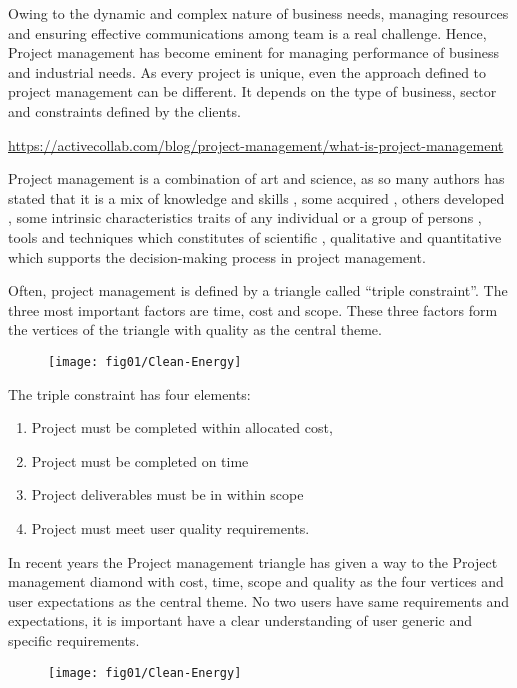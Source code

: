 Owing to the dynamic and complex nature of business needs, managing resources and ensuring effective communications among team is a real challenge. Hence, Project management has become eminent for managing performance of business and industrial needs.
As every project is unique, even the approach defined to project management can be different. It depends on the type of business, sector and constraints defined by the clients. 
 

\url{https://activecollab.com/blog/project-management/what-is-project-management}


Project management is a combination of art and science, as so many authors has stated that it is a mix of knowledge and skills , some acquired , others developed , some intrinsic characteristics traits of any individual or a group of persons , tools and techniques which constitutes of scientific , qualitative and quantitative which supports the decision-making process in project management.

Often, project management is defined by a triangle called “triple constraint”.
The three most important factors are time, cost and scope. These three factors form the vertices of the triangle with quality as the central theme. 


\begin{figure}
\centering
  \texttt{[image: fig01/Clean-Energy]}
 \end{figure}

The triple constraint has four elements:
\begin{enumerate}
    \item Project must be completed within allocated cost,
    \item Project must be completed on time 
    \item Project deliverables must be in within scope
    \item Project must meet user quality requirements.
\end{enumerate}
In recent years the Project management triangle has given a way to the Project management diamond with cost, time, scope and quality as the four vertices and user expectations as the central theme. No two users have same requirements and expectations, it is important have a clear understanding of user generic and specific requirements. 



 \begin{figure}
\centering
  \texttt{[image: fig01/Clean-Energy]}
 \end{figure}

